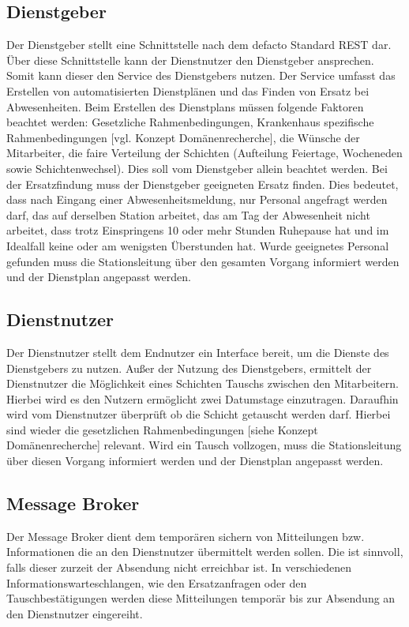 \documentclass[11pt,
paper=a4,
bibtotocnumbered,	  %
liststotocnumbered,  %
DIV=calc,		  %
tablecaptionabove,	  %
headinclude,
]{article}
\begin{document}
\subsection{Dienstgeber}
Der Dienstgeber stellt eine Schnittstelle nach dem defacto Standard REST dar.
Über diese Schnittstelle kann der Dienstnutzer den Dienstgeber ansprechen. Somit kann dieser den Service des Dienstgebers nutzen. Der Service umfasst das Erstellen von automatisierten Dienstplänen und das Finden von Ersatz bei Abwesenheiten. Beim Erstellen des Dienstplans müssen folgende Faktoren beachtet werden: Gesetzliche Rahmenbedingungen, Krankenhaus spezifische Rahmenbedingungen [vgl. Konzept Domänenrecherche], die Wünsche der Mitarbeiter, die faire Verteilung der Schichten (Aufteilung Feiertage, Wocheneden sowie Schichtenwechsel). Dies soll vom Dienstgeber allein beachtet werden. Bei der Ersatzfindung muss der Dienstgeber geeigneten Ersatz finden. Dies bedeutet, dass nach Eingang einer Abwesenheitsmeldung, nur Personal angefragt werden darf, das auf derselben Station arbeitet, das am Tag der Abwesenheit nicht arbeitet, dass trotz Einspringens 10 oder mehr Stunden Ruhepause hat und im Idealfall keine oder am wenigsten Überstunden hat. Wurde geeignetes Personal gefunden muss die Stationsleitung über den gesamten Vorgang informiert werden und der Dienstplan angepasst werden.
\subsection{Dienstnutzer}
Der Dienstnutzer stellt dem Endnutzer ein Interface bereit, um die Dienste des Dienstgebers zu nutzen.
Außer der Nutzung des Dienstgebers, ermittelt der Dienstnutzer die Möglichkeit eines Schichten Tauschs zwischen den Mitarbeitern. Hierbei wird es den Nutzern ermöglicht zwei Datumstage einzutragen. Daraufhin wird vom Dienstnutzer überprüft ob die Schicht getauscht werden darf. Hierbei sind wieder die gesetzlichen Rahmenbedingungen [siehe Konzept Domänenrecherche] relevant. Wird ein Tausch vollzogen, muss die Stationsleitung über diesen Vorgang informiert werden und der Dienstplan angepasst werden.
\subsection{Message Broker}
Der Message Broker dient dem temporären sichern von Mitteilungen bzw. Informationen die an den Dienstnutzer übermittelt werden sollen. Die ist sinnvoll, falls dieser zurzeit der Absendung nicht erreichbar ist. In verschiedenen Informationswarteschlangen, wie den Ersatzanfragen oder den Tauschbestätigungen werden diese Mitteilungen temporär bis zur Absendung an den Dienstnutzer eingereiht.
\end{document}
